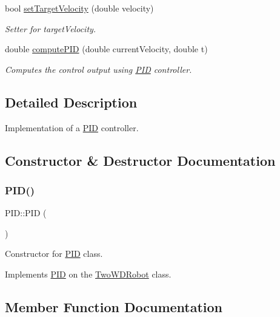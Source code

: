 \begin{DoxyCompactItemize}
bool \hyperlink{classPID_a430bbe62eb2f904eb45ce081d96dc294}{set\+Target\+Velocity} (double velocity)
\begin{DoxyCompactList}\small\item\em Setter for target\+Velocity. \end{DoxyCompactList}\item 
double \hyperlink{classPID_a78583fbe02f451f937db678afb5d1504}{compute\+P\+ID} (double current\+Velocity, double t)
\begin{DoxyCompactList}\small\item\em Computes the control output using \hyperlink{classPID}{P\+ID} controller. \end{DoxyCompactList}\end{DoxyCompactItemize}


\subsection{Detailed Description}
Implementation of a \hyperlink{classPID}{P\+ID} controller. 

\subsection{Constructor \& Destructor Documentation}
\mbox{\label{classPID_a0311b6f7de348499ce24e53ba353514a}} 
\subsubsection{\texorpdfstring{P\+I\+D()}{PID()}}
{\footnotesize\ttfamily P\+I\+D\+::\+P\+ID (\begin{DoxyParamCaption}{ }\end{DoxyParamCaption})}



Constructor for \hyperlink{classPID}{P\+ID} class. 

Implements \hyperlink{classPID}{P\+ID} on the \hyperlink{classTwoWDRobot}{Two\+W\+D\+Robot} class. 

\subsection{Member Function Documentation}
\mbox{\label{classPID_a78583fbe02f451f937db678afb5d1504}} 
